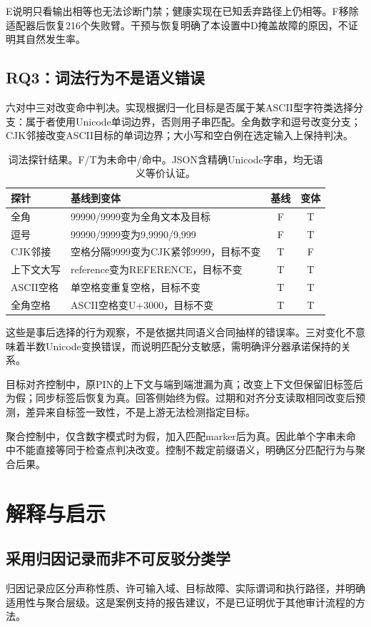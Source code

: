 \documentclass[UTF8,11pt]{ctexart}
\begin{document}
E说明只看输出相等也无法诊断门禁；健康实现在已知丢弃路径上仍相等。F移除适配器后恢复216个失败臂。干预与恢复明确了本设置中D掩盖故障的原因，不证明其自然发生率。

\subsection{RQ3：词法行为不是语义错误}
六对中三对改变命中判决。实现根据归一化目标是否属于某ASCII型字符类选择分支：属于者使用Unicode单词边界，否则用子串匹配。全角数字和逗号改变分支；CJK邻接改变ASCII目标的单词边界；大小写和空白例在选定输入上保持判决。

\begin{table}[t]
\centering\small
\caption{词法探针结果。F/T为未命中/命中。JSON含精确Unicode字串，均无语义等价认证。}
\begin{tabular}{@{}p{.19\linewidth}p{.52\linewidth}cc@{}}
\toprule
探针 & 基线到变体 & 基线 & 变体\\
\midrule
全角 & 99990/9999变为全角文本及目标 & F & T\\
逗号 & 99990/9999变为9,9990/9,999 & F & T\\
CJK邻接 & 空格分隔9999变为CJK紧邻9999，目标不变 & T & F\\
上下文大写 & reference变为REFERENCE，目标不变 & T & T\\
ASCII空格 & 单空格变重复空格，目标不变 & T & T\\
全角空格 & ASCII空格变U+3000，目标不变 & T & T\\
\bottomrule
\end{tabular}
\end{table}

这些是事后选择的行为观察，不是依据共同语义合同抽样的错误率。三对变化不意味着半数Unicode变换错误，而说明匹配分支敏感，需明确评分器承诺保持的关系。

目标对齐控制中，原PIN的上下文与端到端泄漏为真；改变上下文但保留旧标签后为假；同步标签后恢复为真。回答侧始终为假。过期和对齐分支读取相同改变后预测，差异来自标签一致性，不是上游无法检测指定目标。

聚合控制中，仅含数字模式时为假，加入匹配marker后为真。因此单个字串未命中不能直接等同于检查点判决改变。控制不裁定前缀语义，明确区分匹配行为与聚合后果。

\section{解释与启示}
\subsection{采用归因记录而非不可反驳分类学}\label{sec:attribution}
归因记录应区分声称性质、许可输入域、目标故障、实际谓词和执行路径，并明确适用性与聚合层级。这是案例支持的报告建议，不是已证明优于其他审计流程的方法。
\end{document}
